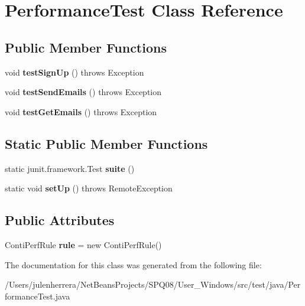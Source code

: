 \hypertarget{class_performance_test}{}\section{Performance\+Test Class Reference}
\label{class_performance_test}
\subsection*{Public Member Functions}
\begin{DoxyCompactItemize}
\item 
\mbox{\label{class_performance_test_a0a857c2d1615e04f9ba4c4ba4712ba71}} 
void {\bfseries test\+Sign\+Up} ()  throws Exception 
\item 
\mbox{\label{class_performance_test_a2c664d2defe58087a1070cd60c3505ec}} 
void {\bfseries test\+Send\+Emails} ()  throws Exception 
\item 
\mbox{\label{class_performance_test_a3e46b46b187f27f9317fcb6599060dd2}} 
void {\bfseries test\+Get\+Emails} ()  throws Exception 
\end{DoxyCompactItemize}
\subsection*{Static Public Member Functions}
\begin{DoxyCompactItemize}
\item 
\mbox{\label{class_performance_test_ab9c39330dc3996ffe7cf5fb93c76f0bb}} 
static junit.\+framework.\+Test {\bfseries suite} ()
\item 
\mbox{\label{class_performance_test_a0355255f88da5dd5be0742d557899e7e}} 
static void {\bfseries set\+Up} ()  throws Remote\+Exception 
\end{DoxyCompactItemize}
\subsection*{Public Attributes}
\begin{DoxyCompactItemize}
\item 
\mbox{\label{class_performance_test_a097c79a3005416f20feefdeb9d22a30d}} 
Conti\+Perf\+Rule {\bfseries rule} = new Conti\+Perf\+Rule()
\end{DoxyCompactItemize}


The documentation for this class was generated from the following file\+:\begin{DoxyCompactItemize}
\item 
/\+Users/julenherrera/\+Net\+Beans\+Projects/\+S\+P\+Q08/\+User\+\_\+\+Windows/src/test/java/Performance\+Test.\+java\end{DoxyCompactItemize}

